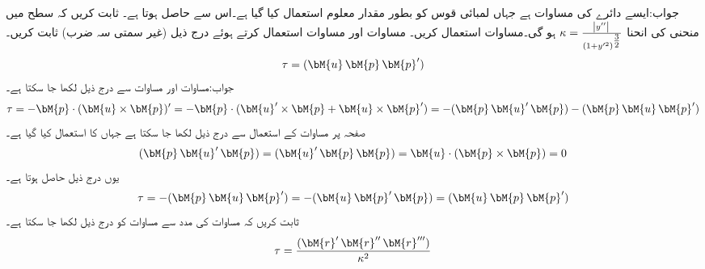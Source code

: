 جواب:ایسے دائرے کی مساوات  ہے جہاں لمبائی قوس کو بطور مقدار معلوم استعمال کیا گیا ہے۔اس سے  حاصل ہوتا ہے۔
ثابت کریں کہ  سطح میں منحنی  کی انحنا 
$\kappa=\tfrac{\abs{y''}}{(1+y'^2)^{\tfrac{3}{2}}}$
ہو گی۔مساوات  استعمال کریں۔
مساوات  اور مساوات  استعمال کرتے ہوئے درج ذیل (غیر سمتی سہ ضرب)  ثابت کریں۔
\begin{align}\label{مساوات_الاحصاء_مروڑ}
\tau=(\bM{u}\,\bM{p}\, \bM{p}')
\end{align}
جواب:مساوات  اور مساوات  سے درج ذیل لکھا جا سکتا ہے۔
\begin{align*}
\tau=-\bM{p}\cdot(\bM{u}\times \bM{p})'=-\bM{p}\cdot(\bM{u}'\times \bM{p}+\bM{u}\times \bM{p}')=-(\bM{p}\,\bM{u}'\,\bM{p})-(\bM{p}\,\bM{u}\,\bM{p}')
\end{align*}
صفحہ  پر مساوات  کے استعمال سے درج ذیل لکھا جا سکتا ہے جہاں
  کا استعمال کیا گیا ہے۔
\begin{align*}
(\bM{p}\,\bM{u}'\,\bM{p})=(\bM{u}'\,\bM{p}\,\bM{p})=\bM{u}\cdot(\bM{p}\times \bM{p})=0
\end{align*}
یوں درج ذیل حاصل ہوتا ہے۔
\begin{align*}
\tau=-(\bM{p}\,\bM{u}\,\bM{p}')=-(\bM{u}\,\bM{p}'\, \bM{p})=(\bM{u}\,\bM{p}\, \bM{p}')
\end{align*}
ثابت کریں کہ مساوات  کی مدد سے  مساوات  کو درج ذیل لکھا جا سکتا ہے۔
\begin{align}
\tau=\frac{(\bM{r}'\,\bM{r}''\,\bM{r}''')}{\kappa^2}
\end{align}

